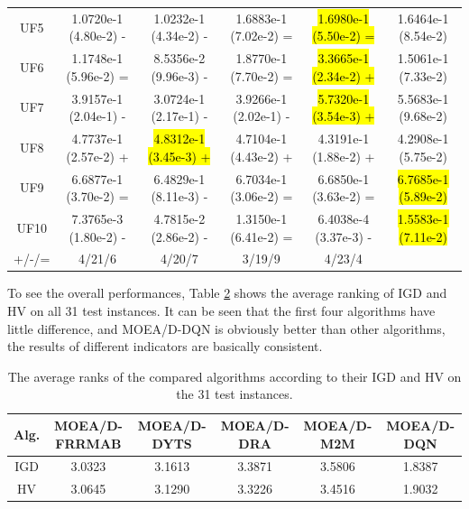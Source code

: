 \documentclass[journal]{IEEEtran}
\begin{document}
\begin{table}[tbp]
\begin{tabular}{cccccc}
    UF5     & 1.0720e-1 (4.80e-2) -      & 1.0232e-1 (4.34e-2) -      & 1.6883e-1 (7.02e-2) =      & \hl{1.6980e-1 (5.50e-2) =} & 1.6464e-1 (8.54e-2)      \\
    UF6     & 1.1748e-1 (5.96e-2) =      & 8.5356e-2 (9.96e-3) -      & 1.8770e-1 (7.70e-2) =      & \hl{3.3665e-1 (2.34e-2) +} & 1.5061e-1 (7.33e-2)      \\
    UF7     & 3.9157e-1 (2.04e-1) -      & 3.0724e-1 (2.17e-1) -      & 3.9266e-1 (2.02e-1) -      & \hl{5.7320e-1 (3.54e-3) +} & 5.5683e-1 (9.68e-2)      \\
    UF8     & 4.7737e-1 (2.57e-2) +      & \hl{4.8312e-1 (3.45e-3) +} & 4.7104e-1 (4.43e-2) +      & 4.3191e-1 (1.88e-2) +      & 4.2908e-1 (5.75e-2)      \\
    UF9     & 6.6877e-1 (3.70e-2) =      & 6.4829e-1 (8.11e-3) -      & 6.7034e-1 (3.06e-2) =      & 6.6850e-1 (3.63e-2) =      & \hl{6.7685e-1 (5.89e-2)} \\
    UF10    & 7.3765e-3 (1.80e-2) -      & 4.7815e-2 (2.86e-2) -      & 1.3150e-1 (6.41e-2) =      & 6.4038e-4 (3.37e-3) -      & \hl{1.5583e-1 (7.11e-2)} \\
    \hline
    +/-/=   & 4/21/6                     & 4/20/7                     & 3/19/9                     & 4/23/4                     &                          \\
    \bottomrule
  \end{tabular}
  \label{tab:hv_all}
\end{table}

To see the overall performances, Table \ref{tab:rank_all} shows the average ranking of IGD and HV on all 31 test instances.
It can be seen that the first four algorithms have little difference, and MOEA/D-DQN is obviously better than other algorithms, the results of different indicators are basically consistent.


\begin{table}[tbp]
  \renewcommand{\arraystretch}{1.2}  %
  \centering
  \caption{The average ranks of the compared algorithms according to their IGD and HV on the 31 test instances.}
  \begin{tabular}{cccccc}
    \toprule
    Alg. & MOEA/D-FRRMAB & MOEA/D-DYTS & MOEA/D-DRA & MOEA/D-M2M & MOEA/D-DQN \\
    \midrule
    IGD  & 3.0323        & 3.1613      & 3.3871     & 3.5806     & 1.8387     \\
    HV   & 3.0645        & 3.1290      & 3.3226     & 3.4516     & 1.9032     \\
    \bottomrule
  \end{tabular}
  \label{tab:rank_all}
\end{table}
\end{document}
